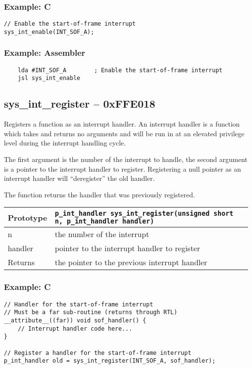 \subsubsection*{Example: C}
\begin{lstlisting}
// Enable the start-of-frame interrupt
sys_int_enable(INT_SOF_A);
\end{lstlisting}

\subsubsection*{Example: Assembler}
\begin{verbatim}
    lda #INT_SOF_A        ; Enable the start-of-frame interrupt
    jsl sys_int_enable
\end{verbatim}

\subsection*{sys\_int\_register -- 0xFFE018}
Registers a function as an interrupt handler. An interrupt handler is a function which takes and returns no arguments and will be run in at an elevated privilege level during the interrupt handling cycle.

The first argument is the number of the interrupt to handle, the second argument is a pointer to the interrupt handler to register. Registering a null pointer as an interrupt handler will ``deregister'' the old handler.

The function returns the handler that was previously registered.

\begin{tabular}{|l||l|} \hline
Prototype & \lstinline!p_int_handler sys_int_register(unsigned short n, p_int_handler handler)! \\ \hline
n & the number of the interrupt \\ \hline
handler & pointer to the interrupt handler to register \\ \hline
Returns & the pointer to the previous interrupt handler \\ \hline
\end{tabular}

\subsubsection*{Example: C}
\begin{lstlisting}
// Handler for the start-of-frame interrupt
// Must be a far sub-routine (returns through RTL)
__attribute__((far)) void sof_handler() {
	// Interrupt handler code here...
}

// Register a handler for the start-of-frame interrupt
p_int_handler old = sys_int_register(INT_SOF_A, sof_handler);
\end{lstlisting}

